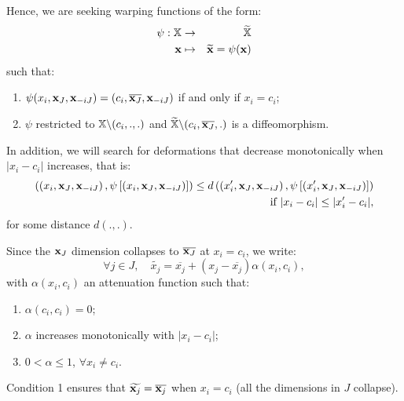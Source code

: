 Hence, we are seeking warping functions of the form: 
\begin{eqnarray*}
 \psi: \mathbb{X} &\rightarrow& \widetilde{\mathbb{X}} \\
 \mathbf{x} & \mapsto &  \widetilde{\mathbf{x}} = \psi(\mathbf{x})
\end{eqnarray*}
such that:
\begin{enumerate}
 \item $\psi(x_i, \mathbf{x}_J, \mathbf{x}_{-iJ}) = (c_i, \overline{\mathbf{x}_J}, \mathbf{x}_{-iJ})$ if and only if $x_i=c_i$;%
 \item $\psi$ restricted to $\mathbb{X} \backslash (c_i,.,.)$ and $\widetilde{\mathbb{X}} \backslash (c_i,\overline{\mathbf{x}_J},.)$ is a diffeomorphism.
\end{enumerate}

In addition, we will search for deformations that decrease monotonically when $\lvert x_i - c_i\rvert$ increases, that is: 
 \begin{eqnarray*}
  \left( \left(x_i, \mathbf{x}_J, \mathbf{x}_{-iJ} \right), \psi\left[\left(x_i, \mathbf{x}_J, \mathbf{x}_{-iJ}\right)\right] \right)\leq d \left( \left(x_i', \mathbf{x}_J, \mathbf{x}_{-iJ} \right), 
 \psi\left[\left(x_i', \mathbf{x}_J, \mathbf{x}_{-iJ}\right)\right]\right)  \\ \text{ if }\lvert x_i- c_i\rvert \leq \lvert x_i'- c_i\rvert, 
 \end{eqnarray*}
for some distance $d(.,.)$.
  
Since the $\mathbf{x}_J$ dimension collapses to $\overline{\mathbf{x}_J}$ at $x_i=c_i$, we write:
\begin{equation}
 \forall j \in J, \quad \widetilde{x_j} = \overline{x_j} + \left( x_j - \overline{x_j}\right)\alpha(x_i, c_i),
\end{equation}
with $\alpha(x_i, c_i)$ an attenuation function such that:
\begin{enumerate}
 \item $\alpha(c_i, c_i) = 0$;
 \item $\alpha$ increases monotonically with $\lvert x_i - c_i\rvert$;
 \item $0 < \alpha \leq 1$, $\forall x_i \neq c_i$.
\end{enumerate}
Condition 1 ensures that $\widetilde{\mathbf{x}_j} = \overline{\mathbf{x}_j}$ when $x_i=c_i$ (all the dimensions in $J$ collapse).



